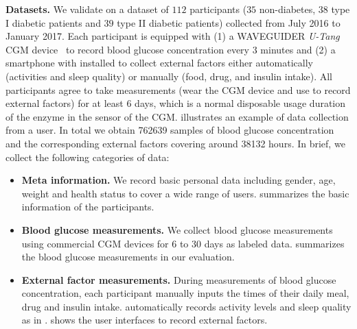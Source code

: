 \textbf{Datasets.}
We validate \sysname on a dataset of $112$ participants ($35$ non-diabetes, $38$ type I diabetic patients and $39$ type II diabetic patients) collected from July 2016 to January 2017.
Each participant is equipped with (1) a WAVEGUIDER \emph{U-Tang} CGM device~\cite{bib:CGM_wave} to record blood glucose concentration every $3$ minutes and (2) a smartphone with \sysname installed to collect external factors either automatically (activities and sleep quality) or manually (food, drug, and insulin intake).
All participants agree to take measurements (\ie wear the CGM device and use \sysname to record external factors) for at least $6$ days, which is a normal disposable usage duration of the enzyme in the sensor of the CGM.
 illustrates an example of data collection from a user.
In total we obtain 762639 samples of blood glucose concentration and the corresponding external factors covering around 38132 hours.
In brief, we collect the following categories of data:
\begin{itemize}
  \item
  \textbf{Meta information.}
  We record basic personal data including gender, age, weight and health status to cover a wide range of users.
   summarizes the basic information of the participants.
  \item
  \textbf{Blood glucose measurements.}
  We collect blood glucose measurements using commercial CGM devices for 6 to 30 days as labeled data.
   summarizes the blood glucose measurements in our evaluation.
  \item
  \textbf{External factor measurements.}
  During measurements of blood glucose concentration, each participant manually inputs the times of their daily meal, drug and insulin intake.
  \sysname automatically records activity levels and sleep quality as in .
   shows the user interfaces to record external factors.
\end{itemize}

